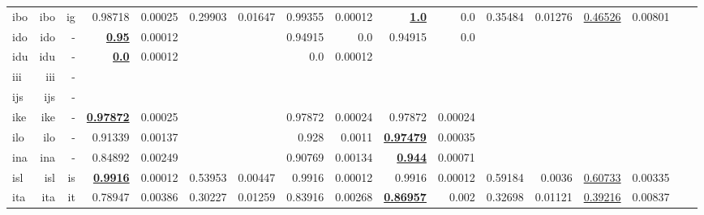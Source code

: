 \documentclass[11pt]{article}
\begin{document}
\begin{table*}[h]
{\begin{tabular}{lrrrrrrrrrrrrrrrr}
ibo         & ibo         & ig         & 0.98718         & 0.00025         & 0.29903         & 0.01647         & 0.99355         & 0.00012         & \textbf{\underline{1.0}}         & 0.0         & 0.35484         & 0.01276         & \underline{0.46526}         & 0.00801         \\
ido         & ido         & -         & \textbf{\underline{0.95}}         & 0.00012         &          &          & 0.94915         & 0.0         & 0.94915         & 0.0         &          &          &          &          \\
idu         & idu         & -         & \textbf{\underline{0.0}}         & 0.00012         &          &          & 0.0         & 0.00012         &          &          &          &          &          &          \\
iii         & iii         & -         &          &          &          &          &          &          &          &          &          &          &          &          \\
ijs         & ijs         & -         &          &          &          &          &          &          &          &          &          &          &          &          \\
ike         & ike         & -         & \textbf{\underline{0.97872}}         & 0.00025         &          &          & 0.97872         & 0.00024         & 0.97872         & 0.00024         &          &          &          &          \\
ilo         & ilo         & -         & 0.91339         & 0.00137         &          &          & 0.928         & 0.0011         & \textbf{\underline{0.97479}}         & 0.00035         &          &          &          &          \\
ina         & ina         & -         & 0.84892         & 0.00249         &          &          & 0.90769         & 0.00134         & \textbf{\underline{0.944}}         & 0.00071         &          &          &          &          \\
isl         & isl         & is         & \textbf{\underline{0.9916}}         & 0.00012         & 0.53953         & 0.00447         & 0.9916         & 0.00012         & 0.9916         & 0.00012         & 0.59184         & 0.0036         & \underline{0.60733}         & 0.00335         \\
ita         & ita         & it         & 0.78947         & 0.00386         & 0.30227         & 0.01259         & 0.83916         & 0.00268         & \textbf{\underline{0.86957}}         & 0.002         & 0.32698         & 0.01121         & \underline{0.39216}         & 0.00837         \\

\end{tabular}}
\end{table*}
\end{document}
